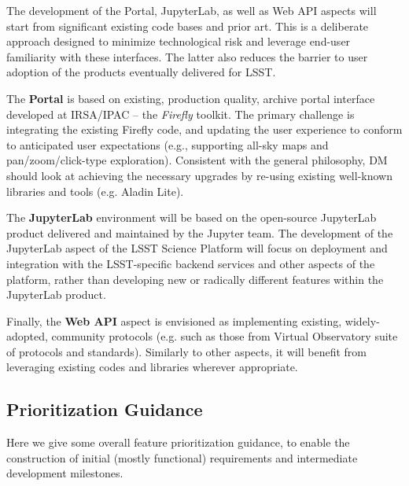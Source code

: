 \documentclass[DM,lsstdraft,toc]{lsstdoc}
\begin{document}
The development of the Portal, JupyterLab, as well as Web API aspects will start from significant existing code bases and prior art. This is a deliberate approach designed to minimize technological risk and leverage end-user familiarity with these interfaces. The latter also reduces the barrier to user adoption of the products eventually delivered for LSST.

The \textbf{Portal} is based on existing, production quality, archive portal interface developed at IRSA/IPAC -- the \emph{Firefly} toolkit. The primary challenge is integrating the existing Firefly code, and updating the user experience to conform to anticipated user expectations (e.g., supporting all-sky maps and pan/zoom/click-type exploration). Consistent with the general philosophy, DM should look at achieving the necessary upgrades by re-using existing well-known libraries and tools (e.g. Aladin Lite).

The \textbf{JupyterLab} environment will be based on the open-source JupyterLab product delivered and maintained by the Jupyter team. The development of the JupyterLab aspect of the LSST Science Platform will focus on deployment and integration with the LSST-specific backend services and other aspects of the platform, rather than developing new or radically different features within the JupyterLab product.

Finally, the \textbf{Web API} aspect is envisioned as implementing existing, widely-adopted, community protocols (e.g. such as those from Virtual Observatory suite of protocols and standards). Similarly to other aspects, it will benefit from leveraging existing codes and libraries wherever appropriate.

\subsection{Prioritization Guidance}

Here we give some overall feature prioritization guidance, to enable the construction of initial (mostly functional) requirements and intermediate development milestones.
\end{document}
